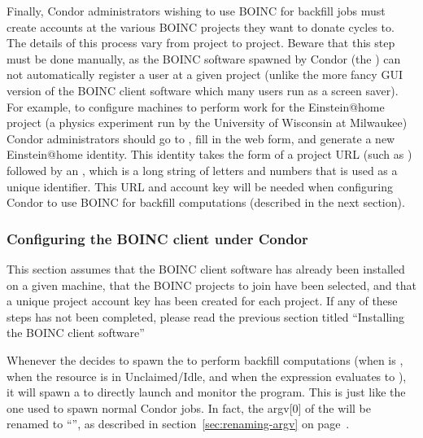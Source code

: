 Finally, Condor administrators wishing to use BOINC for backfill jobs
must create accounts at the various BOINC projects they want to donate
cycles to.
The details of this process vary from project to project.
Beware that this step must be done manually, as the BOINC software
spawned by Condor (the ) can not automatically
register a user at a given project (unlike the more fancy GUI version
of the BOINC client software which many users run as a screen saver). 
For example, to configure machines to perform work for the
Einstein@home project (a physics experiment run by the University of
Wisconsin at Milwaukee) Condor administrators should go to
, fill in
the web form, and generate a new Einstein@home identity.
This identity takes the form of a project URL (such as
) followed by an ,
which is a long string of letters and numbers that is used as a unique
identifier. 
This URL and account key will be needed when configuring Condor to use
BOINC for backfill computations (described in the next section).


\subsubsection{\label{sec:Backfill-BOINC-Condor}Configuring the BOINC client
under Condor}


This section assumes that the BOINC client software has already been
installed on a given machine, that the BOINC projects to join have
been selected, and that a unique project account key has been created
for each project.
If any of these steps has not been completed, please read the previous
section titled ``Installing the BOINC client software''

Whenever the  decides to spawn the 
to perform backfill computations (when  is
, when the resource is in Unclaimed/Idle, and when the
 expression evaluates to ), it will
spawn a  to directly launch and monitor the
 program.
This  is just like the one used to spawn normal Condor
jobs.
In fact, the argv[0] of the  will be renamed to
``'', as described in section~\ref{sec:renaming-argv} on 
page~\pageref{sec:renaming-argv}.

